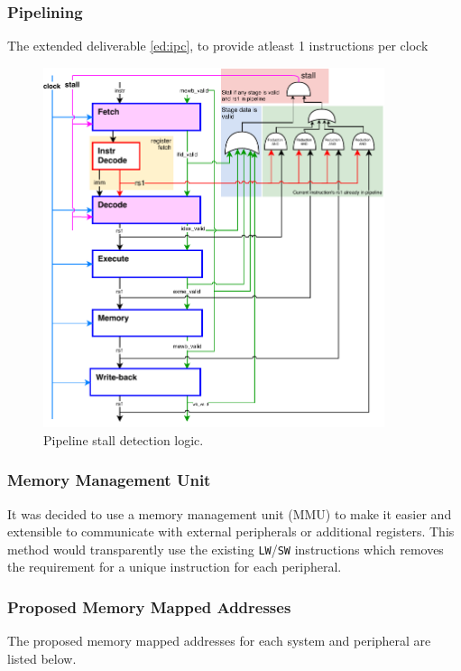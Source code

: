 \documentclass[11pt,a4paper]{report}
\begin{document}
{\subsubsection{Pipelining}
The extended deliverable \ref{ed:ipc}, to provide atleast 1 instructions per clock

\begin{figure}[H]
\centering 
\includegraphics[width=10cm]{../img/stall}
\caption{Pipeline stall detection logic. }
\label{fig:stall}
\end{figure}

\subsubsection{Memory Management Unit}
It was decided to use a memory management unit (MMU) to make it easier and extensible to communicate with external peripherals or additional registers. This method would transparently use the existing \verb|LW|/\verb|SW| instructions which removes the requirement for a unique instruction for each peripheral. 

\subsubsection{Proposed Memory Mapped Addresses}
The proposed memory mapped addresses for each system and peripheral are listed below.

}
\end{document}
